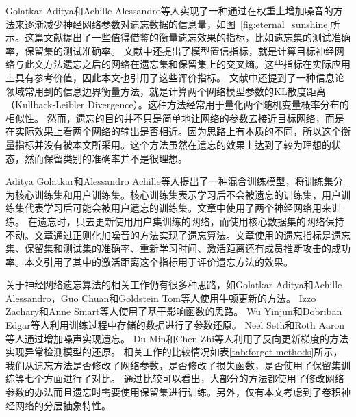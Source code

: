 Golatkar Aditya和Achille Alessandro等人\cite{Golatkar_2020_CVPR}实现了一种通过在权重上增加噪音的方法来逐渐减少神经网络参数对遗忘数据的信息量，如图~\ref{fig:eternal_sunshine}所示。这篇文献提出了一些值得借鉴的衡量遗忘效果的指标，比如遗忘集的测试准确率，保留集的测试准确率。
文献中还提出了模型置信指标，就是计算目标神经网络与此文方法遗忘之后的网络在遗忘集和保留集上的交叉熵。这些指标在实际应用上具有参考价值，因此本文也引用了这些评价指标。
文献中还提到了一种信息论领域常用到的信息边界衡量方法，就是计算两个网络模型参数的KL散度距离（Kullback-Leibler Divergence）。这种方法经常用于量化两个随机变量概率分布的相似性。
然而，遗忘的目的并不只是简单地让网络的参数去接近目标网络，而是在实际效果上看两个网络的输出是否相近。因为思路上有本质的不同，所以这个衡量指标并没有被本文所采用。这个方法虽然在遗忘的效果上达到了较为理想的状态，然而保留类别的准确率并不是很理想。

Aditya Golatkar和Alessandro Achille\cite{Golatkar_2021_CVPR}等人提出了一种混合训练模型，将训练集分为核心训练集和用户训练集。核心训练集表示学习后不会被遗忘的训练集，用户训练集代表学习后可能会被用户遗忘的训练集。文章中使用了两个神经网络用来训练。
在遗忘时，只去更新使用用户集训练的网络，而使用核心数据集的网络保持不动。文章通过正则化加噪音的方法实现了遗忘算法。文章使用的遗忘指标是遗忘集、保留集和测试集的准确率、重新学习时间、激活距离还有成员推断攻击的成功率。本文引用了其中的激活距离这个指标用于评价遗忘方法的效果。

关于神经网络遗忘算法的相关工作仍有很多种思路，如Golatkar Aditya和Achille Alessandro，Guo Chuan和Goldstein Tom等人\cite{10.1007/978-3-030-58526-6_23,pmlr-v119-guo20c}使用牛顿更新的方法。
Izzo Zachary和Anne Smart等人\cite{pmlr-v130-izzo21a}使用了基于影响函数\cite{pmlr-v70-koh17a,cook_weisberg_1982}的思路。
Wu Yinjun和Dobriban Edgar等人\cite{pmlr-v119-wu20b}利用训练过程中存储的数据进行了参数还原。
Neel Seth和Roth Aaron等人\cite{pmlr-v132-neel21a}通过增加噪声实现遗忘。
Du Min和Chen Zhi等人\cite{10.1145/3319535.3363226}利用了反向更新梯度的方法实现异常检测模型的还原。
相关工作的比较情况如表\ref{tab:forget-methods}所示，我们从遗忘方法是否修改了网络参数，是否修改了损失函数，是否使用了保留集训练等七个方面进行了对比。
通过比较可以看出，大部分的方法都使用了修改网络参数的办法而且遗忘时需要使用保留集进行训练。另外，仅有本文考虑到了卷积神经网络的分层抽象特性。

